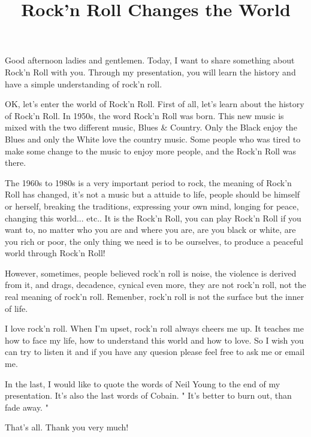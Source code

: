 \documentclass{wordreport}
\title{Rock'n Roll Changes the World}
\begin{document}
\noindent
Good afternoon ladies and gentlemen. Today, I want to share something about Rock'n Roll with you. Through my presentation, you will learn the history and have a simple understanding of rock'n roll. 

OK, let's enter the world of Rock'n Roll. First of all, let's learn about the history of Rock'n Roll. In 1950s, the word Rock'n Roll was born. This new music is mixed with the two different music, Blues \& Country. Only the Black enjoy the Blues and only the White love the country music. Some people who was tired to make some change to the music to enjoy more people, and the Rock'n Roll was there. 

The 1960s to 1980s is a very important period to rock, the meaning of Rock'n Roll has changed, it's not a music but a attuide to life, people should be himself or herself, breaking the traditions, expressing your own mind, longing for peace, changing this world... etc.. It is the Rock'n Roll, you can play Rock'n Roll if you want to, no matter who you are and where you are, are you black or white, are you rich or poor, the only thing we need is to be ourselves, to produce a peaceful world through Rock'n Roll! 

However, sometimes, people believed rock'n roll is noise, the violence is derived from it, and drags, decadence, cynical even more, they are not rock'n roll, not the real meaning of rock'n roll. Remenber, rock'n roll is not the surface but the inner of life.

I love rock'n roll. When I'm upset, rock'n roll always cheers me up. It teaches me how to face my life, how to understand this world and how to love. So I wish you can try to listen it and if you have any quesion please feel free to ask me or email me.

In the last, I would like to quote the words of Neil Young to the end of my presentation. It's also the last words of Cobain. " It's better to burn out, than fade away. " 

That's all. Thank you very much!
\end{document}
